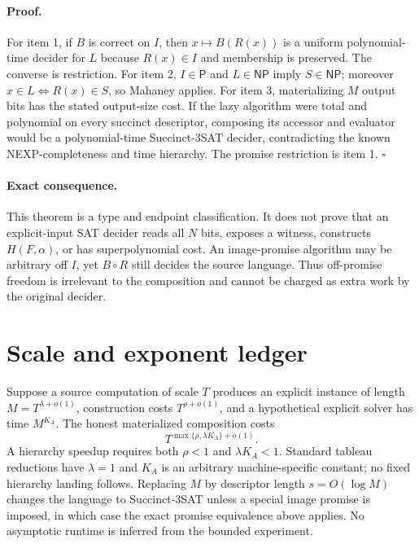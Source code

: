 \documentclass[11pt]{article}
\begin{document}
\paragraph{Proof.}
For item 1, if $B$ is correct on $I$, then $x\mapsto B(R(x))$ is a uniform
polynomial-time decider for $L$ because $R(x)\in I$ and membership is
preserved.  The converse is restriction.  For item 2, $I\in\mathsf P$ and
$L\in\mathsf{NP}$ imply $S\in\mathsf{NP}$; moreover
$x\in L\Longleftrightarrow R(x)\in S$, so Mahaney applies.  For item 3,
materializing $M$ output bits has the stated output-size cost.  If the lazy
algorithm were total and polynomial on every succinct descriptor, composing
its accessor and evaluator would be a polynomial-time Succinct-3SAT decider,
contradicting the known NEXP-completeness and time hierarchy.  The promise
restriction is item 1. \hfill$\square$

\paragraph{Exact consequence.}
This theorem is a type and endpoint classification.  It does not prove that
an explicit-input SAT decider reads all $N$ bits, exposes a witness, constructs
$H(F,\alpha)$, or has superpolynomial cost.  An image-promise algorithm may be
arbitrary off $I$, yet $B\circ R$ still decides the source language.  Thus
off-promise freedom is irrelevant to the composition and cannot be charged as
extra work by the original decider.

\section*{Scale and exponent ledger}
Suppose a source computation of scale $T$ produces an explicit instance of
length $M=T^{\lambda+o(1)}$, construction costs
$T^{\rho+o(1)}$, and a hypothetical explicit solver has time $M^{K_A}$.  The
honest materialized composition costs
\[
 T^{\max\{\rho,\lambda K_A\}+o(1)}.
\]
A hierarchy speedup requires both $\rho<1$ and $\lambda K_A<1$.  Standard
tableau reductions have $\lambda=1$ and $K_A$ is an arbitrary machine-specific
constant; no fixed hierarchy landing follows.  Replacing $M$ by descriptor
length $s=O(\log M)$ changes the language to Succinct-3SAT unless a special
image promise is imposed, in which case the exact promise equivalence above
applies.  No asymptotic runtime is inferred from the bounded experiment.
\end{document}

